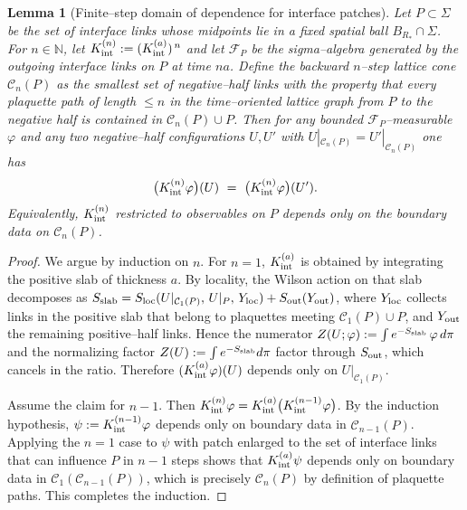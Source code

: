 \documentclass[11pt]{amsart}
\theoremstyle{plain}
\newtheorem{lemma}[theorem]{Lemma}
\theoremstyle{definition}
\theoremstyle{remark}
\begin{document}
\begin{lemma}[Finite--step domain of dependence for interface patches]\label{lem:finite-step-cone}
Let $P\subset \Sigma$ be the set of interface links whose midpoints lie in a fixed spatial ball $B_{R_*}\cap\Sigma$. For $n\in\mathbb N$, let $K^{(n)}_{\rm int}:=(K_{\rm int}^{(a)})^{\,n}$ and let $\mathcal F_P$ be the sigma--algebra generated by the outgoing interface links on $P$ at time $n a$. Define the backward $n$--step lattice cone $\mathcal C_n(P)$ as the smallest set of negative--half links with the property that every plaquette path of length $\le n$ in the time--oriented lattice graph from $P$ to the negative half is contained in $\mathcal C_n(P)\cup P$. Then for any bounded $\mathcal F_P$--measurable $\varphi$ and any two negative--half configurations $U,U'$ with $U|_{\mathcal C_n(P)}=U'|_{\mathcal C_n(P)}$ one has
\[
  \big(K^{(n)}_{\rm int}\varphi\big)(U)\ =\ \big(K^{(n)}_{\rm int}\varphi\big)(U').
\]
Equivalently, $K^{(n)}_{\rm int}$ restricted to observables on $P$ depends only on the boundary data on $\mathcal C_n(P)$.
\end{lemma}
\begin{proof}
We argue by induction on $n$. For $n=1$, $K_{\rm int}^{(a)}$ is obtained by integrating the positive slab of thickness $a$. By locality, the Wilson action on that slab decomposes as $S_{\rm slab}=S_{\rm loc}(U|_{\mathcal C_1(P)},\,U|_P,\,Y_{\rm loc})+S_{\rm out}(Y_{\rm out})$, where $Y_{\rm loc}$ collects links in the positive slab that belong to plaquettes meeting $\mathcal C_1(P)\cup P$, and $Y_{\rm out}$ the remaining positive--half links. Hence the numerator $Z(U;\varphi):=\int e^{-S_{\rm slab}}\,\varphi\,d\pi$ and the normalizing factor $Z(U):=\int e^{-S_{\rm slab}}d\pi$ factor through $S_{\rm out}$, which cancels in the ratio. Therefore $(K_{\rm int}^{(a)}\varphi)(U)$ depends only on $U|_{\mathcal C_1(P)}$.

Assume the claim for $n-1$. Then $K^{(n)}_{\rm int}\varphi=K_{\rm int}^{(a)}\big(K^{(n-1)}_{\rm int}\varphi\big)$. By the induction hypothesis, $\psi:=K^{(n-1)}_{\rm int}\varphi$ depends only on boundary data in $\mathcal C_{n-1}(P)$. Applying the $n=1$ case to $\psi$ with patch enlarged to the set of interface links that can influence $P$ in $n-1$ steps shows that $K_{\rm int}^{(a)}\psi$ depends only on boundary data in $\mathcal C_1(\mathcal C_{n-1}(P))$, which is precisely $\mathcal C_n(P)$ by definition of plaquette paths. This completes the induction.
\end{proof}
\end{document}

